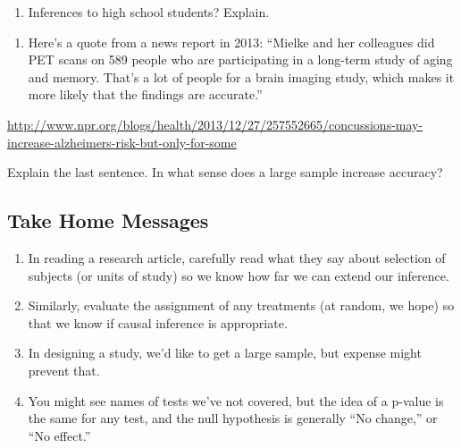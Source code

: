 \documentclass[
]{report}
\providecommand{\tightlist}{%
  \setlength{\itemsep}{0pt}\setlength{\parskip}{0pt}}
\begin{document}
\vspace{0.5in}

\begin{enumerate}
\def\labelenumi{\alph{enumi})}
\setcounter{enumi}{3}
\tightlist
\item
  Inferences to high school students? Explain.
\end{enumerate}

\vspace{0.5in}

\begin{enumerate}
\def\labelenumi{\arabic{enumi}.}
\setcounter{enumi}{4}
\tightlist
\item
  Here's a quote from a news report in 2013:
  ``Mielke and her colleagues did PET scans on 589 people who are participating in a long-term study of aging and memory. That's a lot of people for a brain imaging study, which makes it more likely that the findings are accurate.''
\end{enumerate}

\url{http://www.npr.org/blogs/health/2013/12/27/257552665/concussions-may-increase-alzheimers-risk-but-only-for-some}

Explain the last sentence. In what sense does a large sample increase accuracy?

\vspace{1in}

\hypertarget{take-home-messages-21}{%
\subsection{Take Home Messages}\label{take-home-messages-21}}

\begin{enumerate}
\def\labelenumi{\arabic{enumi}.}
\item
  In reading a research article, carefully read what they say about selection of subjects (or units of study) so we know how far we can extend our inference.
\item
  Similarly, evaluate the assignment of any treatments (at random, we hope) so that we know if causal inference is appropriate.
\item
  In designing a study, we'd like to get a large sample, but expense might prevent that.
\item
  You might see names of tests we've not covered, but the idea of a p-value is the same for any test, and the null hypothesis is generally ``No change,'' or ``No effect.''
\end{enumerate}
\end{document}
